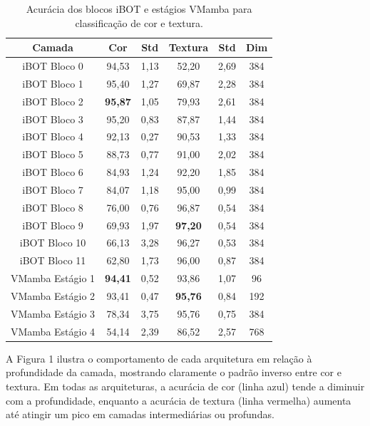\documentclass[conference]{IEEEtran}
\begin{document}
\begin{table}[htbp]
\caption{Acur\'{a}cia dos blocos iBOT e est\'{a}gios VMamba para classifica\c{c}\~{a}o de cor e textura.}
\begin{center}
\begin{tabular}{|c|c|c|c|c|c|}
\hline
\textbf{Camada} & \textbf{Cor} & \textbf{Std} & \textbf{Textura} & \textbf{Std} & \textbf{Dim}\\
\hline
iBOT Bloco 0 & 94,53 & 1,13 & 52,20 & 2,69 & 384 \\
\hline
iBOT Bloco 1 & 95,40 & 1,27 & 69,87 & 2,28 & 384 \\
\hline
iBOT Bloco 2 & \textbf{95,87} & 1,05 & 79,93 & 2,61 & 384 \\
\hline
iBOT Bloco 3 & 95,20 & 0,83 & 87,87 & 1,44 & 384 \\
\hline
iBOT Bloco 4 & 92,13 & 0,27 & 90,53 & 1,33 & 384 \\
\hline
iBOT Bloco 5 & 88,73 & 0,77 & 91,00 & 2,02 & 384 \\
\hline
iBOT Bloco 6 & 84,93 & 1,24 & 92,20 & 1,85 & 384 \\
\hline
iBOT Bloco 7 & 84,07 & 1,18 & 95,00 & 0,99 & 384 \\
\hline
iBOT Bloco 8 & 76,00 & 0,76 & 96,87 & 0,54 & 384 \\
\hline
iBOT Bloco 9 & 69,93 & 1,97 & \textbf{97,20} & 0,54 & 384 \\
\hline
iBOT Bloco 10 & 66,13 & 3,28 & 96,27 & 0,53 & 384 \\
\hline
iBOT Bloco 11 & 62,80 & 1,73 & 96,00 & 0,87 & 384 \\
\hline
VMamba Est\'{a}gio 1 & \textbf{94,41} & 0,52 & 93,86 & 1,07 & 96 \\
\hline
VMamba Est\'{a}gio 2 & 93,41 & 0,47 & \textbf{95,76} & 0,84 & 192 \\
\hline
VMamba Est\'{a}gio 3 & 78,34 & 3,75 & 95,76 & 0,75 & 384 \\
\hline
VMamba Est\'{a}gio 4 & 54,14 & 2,39 & 86,52 & 2,57 & 768 \\
\hline
\end{tabular}
\label{tab3}
\end{center}
\end{table}

A Figura 1 ilustra o comportamento de cada arquitetura em rela\c{c}\~{a}o \`{a} profundidade da camada, mostrando claramente o padr\~{a}o inverso entre cor e textura. Em todas as arquiteturas, a acur\'{a}cia de cor (linha azul) tende a diminuir com a profundidade, enquanto a acur\'{a}cia de textura (linha vermelha) aumenta at\'{e} atingir um pico em camadas intermedi\'{a}rias ou profundas.
\end{document}
